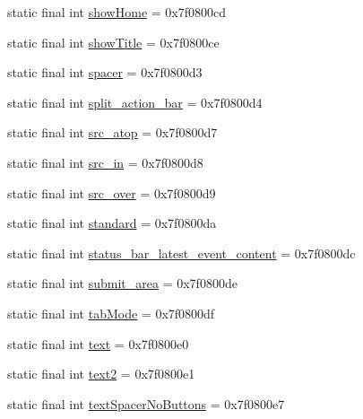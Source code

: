 \begin{DoxyCompactItemize}
\item 
static final int \mbox{\hyperlink{classcom_1_1google_1_1android_1_1gms_1_1R_1_1id_ab7c6dff28cfce4dd45396fd53363752f}{show\+Home}} = 0x7f0800cd
\item 
static final int \mbox{\hyperlink{classcom_1_1google_1_1android_1_1gms_1_1R_1_1id_abddae5cb718c591b83d13cbcba9391bb}{show\+Title}} = 0x7f0800ce
\item 
static final int \mbox{\hyperlink{classcom_1_1google_1_1android_1_1gms_1_1R_1_1id_ab725edeadb71114276c7247d865cd3b3}{spacer}} = 0x7f0800d3
\item 
static final int \mbox{\hyperlink{classcom_1_1google_1_1android_1_1gms_1_1R_1_1id_a60fd53fc326bf335b6b9da2d7583eb31}{split\+\_\+action\+\_\+bar}} = 0x7f0800d4
\item 
static final int \mbox{\hyperlink{classcom_1_1google_1_1android_1_1gms_1_1R_1_1id_a30267579bc12f2ae175736f35e8e6482}{src\+\_\+atop}} = 0x7f0800d7
\item 
static final int \mbox{\hyperlink{classcom_1_1google_1_1android_1_1gms_1_1R_1_1id_a51e483bae98bd45c185e0715c510af82}{src\+\_\+in}} = 0x7f0800d8
\item 
static final int \mbox{\hyperlink{classcom_1_1google_1_1android_1_1gms_1_1R_1_1id_ad909d9a263d47ba5f134aa0ccddef178}{src\+\_\+over}} = 0x7f0800d9
\item 
static final int \mbox{\hyperlink{classcom_1_1google_1_1android_1_1gms_1_1R_1_1id_a4503781f52bda48c66f8fde6740a7e53}{standard}} = 0x7f0800da
\item 
static final int \mbox{\hyperlink{classcom_1_1google_1_1android_1_1gms_1_1R_1_1id_aeca08a5751cab888a493b393f30d5358}{status\+\_\+bar\+\_\+latest\+\_\+event\+\_\+content}} = 0x7f0800dc
\item 
static final int \mbox{\hyperlink{classcom_1_1google_1_1android_1_1gms_1_1R_1_1id_a5eab73f8c2b0ee3353c6f15245599846}{submit\+\_\+area}} = 0x7f0800de
\item 
static final int \mbox{\hyperlink{classcom_1_1google_1_1android_1_1gms_1_1R_1_1id_a9f4b4e1c091e999456b1d06f3af838e2}{tab\+Mode}} = 0x7f0800df
\item 
static final int \mbox{\hyperlink{classcom_1_1google_1_1android_1_1gms_1_1R_1_1id_a818e4b14a35cf06fe3763e2aab7d1316}{text}} = 0x7f0800e0
\item 
static final int \mbox{\hyperlink{classcom_1_1google_1_1android_1_1gms_1_1R_1_1id_a089496df67dce8b7ec78710b640ae648}{text2}} = 0x7f0800e1
\item 
static final int \mbox{\hyperlink{classcom_1_1google_1_1android_1_1gms_1_1R_1_1id_a443bde94977d855f22450cb5a5ffd754}{text\+Spacer\+No\+Buttons}} = 0x7f0800e7

\end{DoxyCompactItemize}
